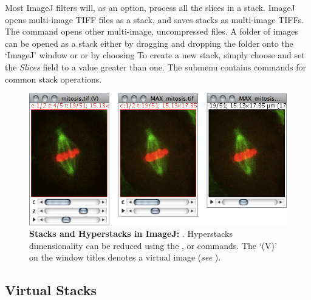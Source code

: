 Most ImageJ filters will, as an option, process all the slices in
a stack. ImageJ opens multi-image TIFF files as a stack, and saves
stacks as multi-image TIFFs. The 
command opens other multi-image, uncompressed files. A folder of images
can be opened as a stack either by dragging and dropping the folder
onto the `ImageJ' window or or by choosing 
To create a new stack, simply choose 
and set the \emph{Slices} field to a value greater than one. The 
submenu contains commands for common stack operations.
\begin{figure}
\noindent \includegraphics[scale=0.55]{images/StacksHyperstacks}\caption[Stacks and Hyperstacks]{\label{fig:Stacks-and-Hyperstacks}\textbf{Stacks and Hyperstacks
in ImageJ:}\textsf{ }\protect{}.
Hyperstacks dimensionality can be reduced using the \protect{},
\protect{}
or \protect{}
commands. The `(V)' on the window titles denotes a virtual image
(\emph{see} ).}
\end{figure}





\subsection*{Virtual Stacks\label{sub:Virtual-Stacks}}

